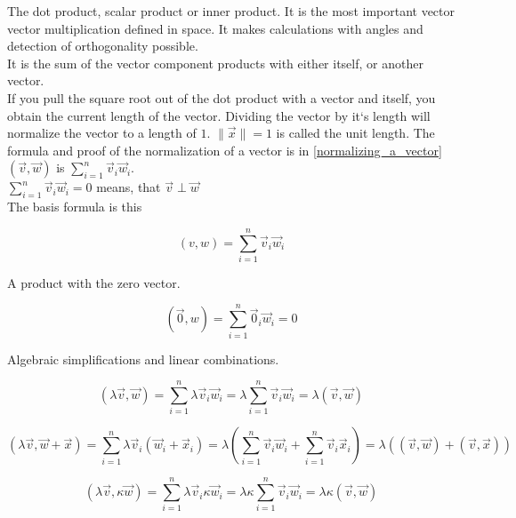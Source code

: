 \documentclass[a4paper]{article}
\begin{document}
The dot product, scalar product or inner product.
It is the most important vector vector multiplication defined in space.
It makes calculations with angles and detection of orthogonality possible.\\

It is the sum of the vector component products with either itself, or another vector.\\

If you pull the square root out of the dot product with a vector and itself, you obtain the current length of the vector.
Dividing the vector by it`s length will normalize the vector to a length of $1$. $\|\vec{x}\| = 1$ is called the unit length.
The formula and proof of the normalization of a vector is in \ref{normalizing_a_vector}\\

$(\vec{v}, \vec{w})$ is $\sum_{i=1}^{n}\vec{v}_{i}\vec{w}_{i}$.  \\

$\sum_{i=1}^{n}\vec{v}_{i}\vec{w}_{i} = 0$ means, that $\vec{v} \perp \vec{w}$ \\

The basis formula is this

\begin{displaymath}
    (v,w) = \sum_{i=1}^{n}\vec{v}_{i}\vec{w}_{i}
\end{displaymath}

A product with the zero vector.

\begin{displaymath}
    (\vec{0},w) = \sum_{i=1}^{n}\vec{0}_{i}\vec{w}_{i} = 0
\end{displaymath}

Algebraic simplifications and linear combinations.

\begin{displaymath}
    (\lambda\vec{v},\vec{w}) = \sum_{i=1}^{n}\lambda\vec{v}_{i}\vec{w}_{i}
    = \lambda\sum_{i=1}^{n}\vec{v}_{i}\vec{w}_{i} = \lambda(\vec{v}, \vec{w})
\end{displaymath}

\begin{displaymath}
    (\lambda\vec{v},\vec{w}+\vec{x}) = \sum_{i=1}^{n}\lambda\vec{v}_{i}(\vec{w}_{i}+\vec{x}_{i})
    = \lambda(\sum_{i=1}^{n}\vec{v}_{i}\vec{w}_{i}+\sum_{i=1}^{n}\vec{v}_{i}\vec{x}_{i})
    = \lambda((\vec{v},\vec{w})+(\vec{v},\vec{x}))
\end{displaymath}

\begin{displaymath}
    (\lambda\vec{v},\kappa\vec{w}) = \sum_{i=1}^{n}\lambda\vec{v}_{i}\kappa\vec{w}_{i}
    = \lambda\kappa\sum_{i=1}^{n}\vec{v}_{i}\vec{w}_{i} = \lambda\kappa(\vec{v}, \vec{w})
\end{displaymath}
\end{document}
